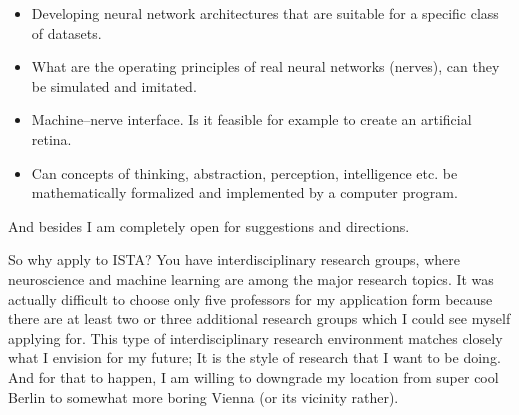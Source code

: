 \documentclass[a4paper,10pt]{article}
\begin{document}
\begin{itemize}
\item{} Developing neural network architectures that are suitable for a specific
class of datasets.
\item{} What are the operating principles of real neural networks (nerves), can
they be simulated and imitated. 
\item{} Machine--nerve interface. Is it feasible for example to create an
artificial retina.
\item{} Can concepts of thinking, abstraction, perception, intelligence etc. be
mathematically formalized and implemented by a computer program.
\end{itemize}

And besides I am completely open for suggestions and directions.

So why apply to ISTA? 
You have interdisciplinary
research groups, where neuroscience and machine learning are among the major
research topics.
It was actually difficult to choose only five professors for my application form
because there are at least two or three additional research groups which I could
see myself applying for.
This type of interdisciplinary research environment matches closely what I
envision for my future; It is the style
of research that I want
to be doing. And for that to happen, I am willing to downgrade my location from
super cool Berlin to somewhat more boring Vienna (or its vicinity rather).

\nocite{mpgvaeRepo}
\nocite{mg22Repo}
\printbibliography
\end{document}
